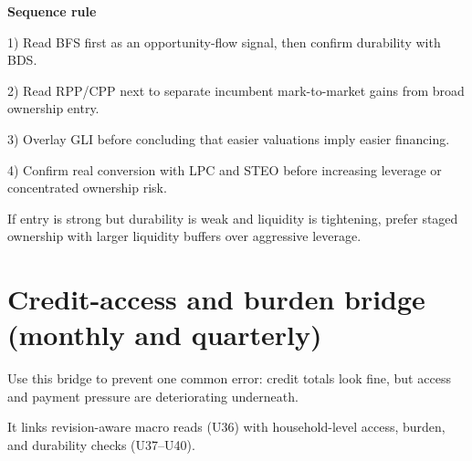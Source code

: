 \documentclass[11pt,openany]{book}
\begin{document}
\begin{notebox}
\textbf{Sequence rule}\par
1) Read BFS first as an opportunity-flow signal, then confirm durability with BDS.\par
2) Read RPP/CPP next to separate incumbent mark-to-market gains from broad ownership entry.\par
3) Overlay GLI before concluding that easier valuations imply easier financing.\par
4) Confirm real conversion with LPC and STEO before increasing leverage or concentrated ownership risk.
\end{notebox}

If entry is strong but durability is weak and liquidity is tightening, prefer staged ownership with larger liquidity buffers over aggressive leverage.

\section{Credit-access and burden bridge (monthly and quarterly)}

Use this bridge to prevent one common error: credit totals look fine, but access and payment pressure are deteriorating underneath.

It links revision-aware macro reads (U36) with household-level access, burden, and durability checks (U37--U40).
\end{document}
